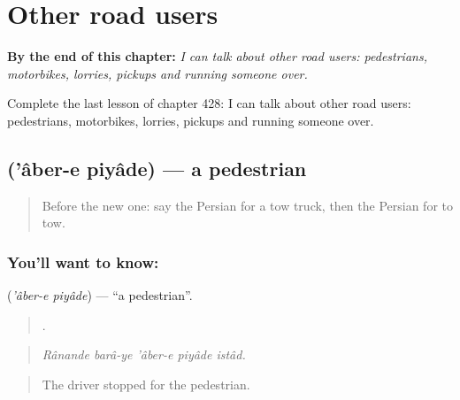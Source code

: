
\chapter{Other road users}
\label{ch:fa-other-road-users}

\begin{chapteropening}
\textbf{By the end of this chapter:} \emph{I can talk about other road users: pedestrians, motorbikes, lorries, pickups and running someone over.}

Complete the last lesson of chapter 428: I can talk about other road users: pedestrians, motorbikes, lorries, pickups and running someone over.
\end{chapteropening}

\section[\texorpdfstring{\fa{عابر} \fa{پیاده} ('âber-e piyâde)}{عابر پیاده ('âber-e piyâde)}]{  ('âber-e piyâde) — a pedestrian}

\label{lesson:FA-C428-aber-e-piyade}



\begin{quote}
Before the new one: say the Persian for a tow truck, then the Persian for to tow.
\end{quote}

\subsection*{You'll want to know:  }
\textbf{ } (\emph{'âber-e piyâde}) — \textquotedblleft{}a pedestrian\textquotedblright{}.

\begin{quote}
    .
\end{quote}

\begin{quote}
\emph{Rânande barâ-ye 'âber-e piyâde istâd.}
\end{quote}

\begin{quote}
The driver stopped for the pedestrian.
\end{quote}


